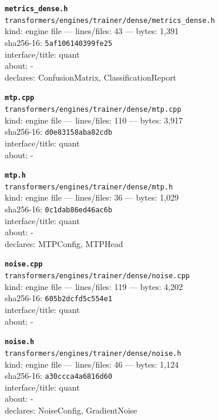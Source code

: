 \noindent\textbf{\texttt{metrics\_dense.h}}\\
\texttt{transformers/engines/trainer/dense/metrics\_dense.h}\\
kind: engine file --- lines/files: 43 --- bytes: 1,391\\
sha256-16: \texttt{5af106140399fe25}\\
interface/title: quant\\
about: -\\
declares: ConfusionMatrix, ClassificationReport\\
\vspace*{6.0pt}
\newpage

\noindent\textbf{\texttt{mtp.cpp}}\\
\texttt{transformers/engines/trainer/dense/mtp.cpp}\\
kind: engine file --- lines/files: 110 --- bytes: 3,917\\
sha256-16: \texttt{d0e83158aba82cdb}\\
interface/title: quant\\
about: -\\
\vspace*{6.0pt}

\noindent\textbf{\texttt{mtp.h}}\\
\texttt{transformers/engines/trainer/dense/mtp.h}\\
kind: engine file --- lines/files: 36 --- bytes: 1,029\\
sha256-16: \texttt{0c1dab86ed46ac6b}\\
interface/title: quant\\
about: -\\
declares: MTPConfig, MTPHead\\
\vspace*{6.0pt}

\noindent\textbf{\texttt{noise.cpp}}\\
\texttt{transformers/engines/trainer/dense/noise.cpp}\\
kind: engine file --- lines/files: 119 --- bytes: 4,202\\
sha256-16: \texttt{605b2dcfd5c554e1}\\
interface/title: quant\\
about: -\\
\vspace*{6.0pt}

\noindent\textbf{\texttt{noise.h}}\\
\texttt{transformers/engines/trainer/dense/noise.h}\\
kind: engine file --- lines/files: 46 --- bytes: 1,124\\
sha256-16: \texttt{a30ccca4a6816d60}\\
interface/title: quant\\
about: -\\
declares: NoiseConfig, GradientNoise\\
\vspace*{6.0pt}
\newpage

